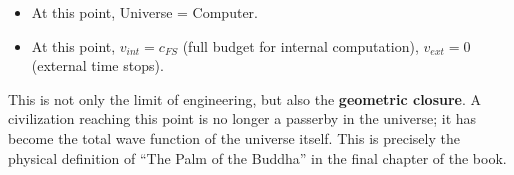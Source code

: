 \begin{itemize}
\item At this point, Universe = Computer.

\item At this point, $v_{int} = c_{FS}$ (full budget for internal computation), $v_{ext} = 0$ (external time stops).
\end{itemize}

This is not only the limit of engineering, but also the \textbf{geometric closure}. A civilization reaching this point is no longer a passerby in the universe; it has become the total wave function of the universe itself. This is precisely the physical definition of ``The Palm of the Buddha'' in the final chapter of the book.

